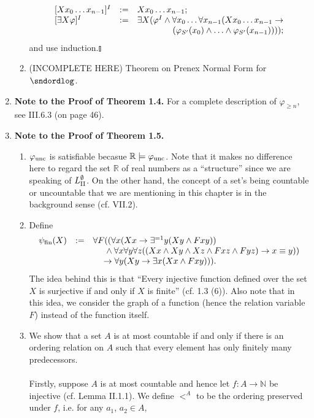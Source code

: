 \begin{enumerate}[1.]
\begin{enumerate}[(1)]
\[\begin{array}{lll}
[X x_0 \ldots x_{n - 1}]^I & := & X x_0 \ldots x_{n - 1}; \cr
[\exists X \varphi]^I & := & \exists X (\varphi^I \land \forall x_0 \ldots \forall x_{n - 1} (X x_0 \ldots x_{n - 1} \rightarrow \cr
\ & \ & \multicolumn{1}{r}{(\varphi_{S^\prime}(x_0) \land \ldots \land \varphi_{S^\prime}(x_{n - 1}))));}
\end{array}
\]
and use induction.\nolinebreak\hfill$\talloblong$
\item (INCOMPLETE HERE) Theorem on Prenex Normal Form for $\sndordlog$.
\end{enumerate}
%
\item \textbf{Note to the Proof of Theorem 1.4.} For a complete description of $\varphi_{\geq n}$, see III.6.3 (on page 46).
%
\item \textbf{Note to the Proof of Theorem 1.5.}
\begin{enumerate}[(1)]
\item $\varphi_{\mbox{\scriptsize unc}}$ is satisfiable becasue $\mathbb{R} \models \varphi_{\mbox{\scriptsize unc}}$. Note that it makes no difference here to regard the set $\mathbb{R}$ of real numbers as a ``structure'' since we are speaking of $L^\emptyset_{\mbox{\scriptsize II}}$. On the other hand, the concept of a set's being countable or uncountable that we are mentioning in this chapter is in the background sense (cf. VII.2).
\item Define
\[
\begin{array}{lll}
\psi_{\mbox{\scriptsize fin}}(X) & := & \forall F ((\forall x (Xx \rightarrow \exists^{=1} y (Xy \land Fxy)) \\
\                             & \  & \phantom{\forall F} \land \forall x \forall y \forall z ((Xx \land Xy \land Xz \land Fxz \land Fyz) \rightarrow x \equiv y)) \\
\                             & \  & \phantom{\forall (} \rightarrow \forall y (Xy \rightarrow \exists x (Xx \land Fxy))).
\end{array}
\]
The idea behind this is that ``Every injective function defined over the set $X$ is surjective if and only if $X$ is finite'' (cf. 1.3 (6)). Also note that in this idea, we consider the graph of a function (hence the relation variable $F$) instead of the function itself.
\item We show that a set $A$ is at most countable if and only if there is an ordering relation on $A$ such that every element has only finitely many predecessors.\\
\\
Firstly, suppose $A$ is at most countable and hence let $f: A \to \mathbb{N}$ be injective (cf. Lemma II.1.1). We define $<^A$ to be the ordering preserved under $f$, i.e. for any $a_1$, $a_2 \in A$,

\end{enumerate}
\end{enumerate}
